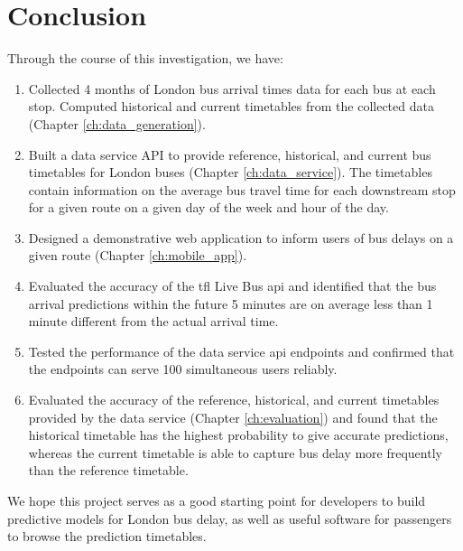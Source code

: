









\chapter{Conclusion}
\par Through the course of this investigation, we have:

\begin{enumerate}
  \item Collected 4 months of London bus arrival times data for each bus at each stop. Computed historical and current timetables from the collected data (Chapter \ref{ch:data_generation}).
  \item Built a data service API to provide reference, historical, and current bus timetables for London buses (Chapter \ref{ch:data_service}). The timetables contain information on the average bus travel time for each downstream stop for a given route on a given day of the week and hour of the day.
  \item Designed a demonstrative web application to inform users of bus delays on a given route (Chapter \ref{ch:mobile_app}).
  \item Evaluated the accuracy of the \acrshort{tfl} Live Bus \acrshort{api} and identified that the bus arrival predictions within the future 5 minutes are on average less than 1 minute different from the actual arrival time.
  \item Tested the performance of the data service \acrshort{api} endpoints and confirmed that the endpoints can serve 100 simultaneous users reliably.
  \item Evaluated the accuracy of the reference, historical, and current timetables provided by the data service (Chapter \ref{ch:evaluation}) and found that the historical timetable has the highest probability to give accurate predictions, whereas the current timetable is able to capture bus delay more frequently than the reference timetable.
\end{enumerate}

\par We hope this project serves as a good starting point for developers to build predictive models for London bus delay, as well as useful software for passengers to browse the prediction timetables.
